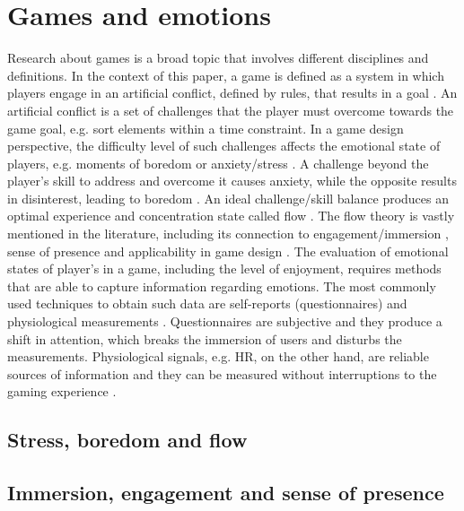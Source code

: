 \chapter{Games and emotions}

Research about games is a broad topic that involves different disciplines and definitions. In the context of this paper, a game is defined as a system in which players engage in an artificial conflict, defined by rules, that results in a goal \parencite{salen2004rules}. An artificial conflict is a set of challenges that the player must overcome towards the game goal, e.g. sort elements within a time constraint. In a game design perspective, the difficulty level of such challenges affects the emotional state of players, e.g. moments of boredom or anxiety/stress \parencite{schell2014art}. A challenge beyond the player's skill to address and overcome it causes anxiety, while the opposite results in disinterest, leading to boredom \parencite{chen2007flow}. An ideal challenge/skill balance produces an optimal experience and concentration state called flow \cite{csikszentmihalyi1990psychology}. The flow theory is vastly mentioned in the literature, including its connection to engagement/immersion \cite{brown2004grounded}, sense of presence \cite{weibel2011immersion} and applicability in game design \cite{cruz2017player, sweetser2005gameflow}. The evaluation of emotional states of player's in a game, including the level of enjoyment, requires methods that are able to capture information regarding emotions. The most commonly used techniques to obtain such data are self-reports (questionnaires) and physiological measurements \cite{mekler2014systematic}. Questionnaires are subjective and they produce a shift in attention, which breaks the immersion of users and disturbs the measurements. Physiological signals, e.g. HR, on the other hand, are reliable sources of information and they can be measured without interruptions to the gaming experience \parencite{bousefsaf2013remote,yun2009game,rani2006empirical,tijs2008dynamic}.

\section{Stress, boredom and flow}

\section{Immersion, engagement and sense of presence}
